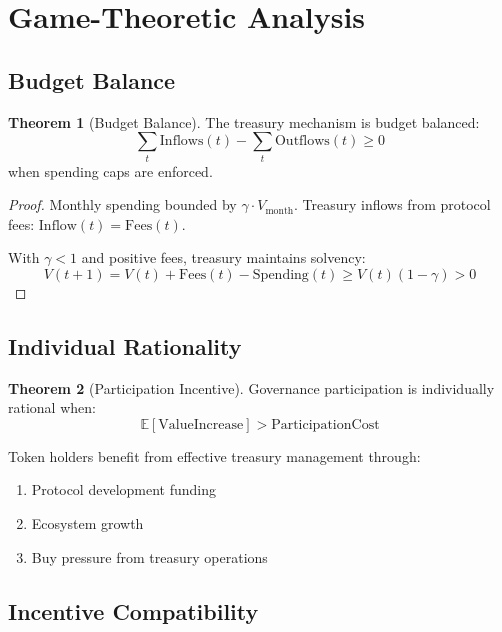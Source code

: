 \documentclass[11pt,a4paper]{article}
\theoremstyle{definition}
\newtheorem{theorem}{Theorem}[section]
\theoremstyle{remark}
\begin{document}
\section{Game-Theoretic Analysis}

\subsection{Budget Balance}

\begin{theorem}[Budget Balance]
The treasury mechanism is budget balanced:
\begin{equation}
    \sum_t \text{Inflows}(t) - \sum_t \text{Outflows}(t) \geq 0
\end{equation}
when spending caps are enforced.
\end{theorem}

\begin{proof}
Monthly spending bounded by $\gamma \cdot V_{\text{month}}$.
Treasury inflows from protocol fees: $\text{Inflow}(t) = \text{Fees}(t)$.

With $\gamma < 1$ and positive fees, treasury maintains solvency:
\begin{equation}
    V(t+1) = V(t) + \text{Fees}(t) - \text{Spending}(t) \geq V(t)(1 - \gamma) > 0
\end{equation}
\end{proof}

\subsection{Individual Rationality}

\begin{theorem}[Participation Incentive]
Governance participation is individually rational when:
\begin{equation}
    \mathbb{E}[\text{ValueIncrease}] > \text{ParticipationCost}
\end{equation}
\end{theorem}

Token holders benefit from effective treasury management through:
\begin{enumerate}
    \item Protocol development funding
    \item Ecosystem growth
    \item Buy pressure from treasury operations
\end{enumerate}

\subsection{Incentive Compatibility}
\end{document}
